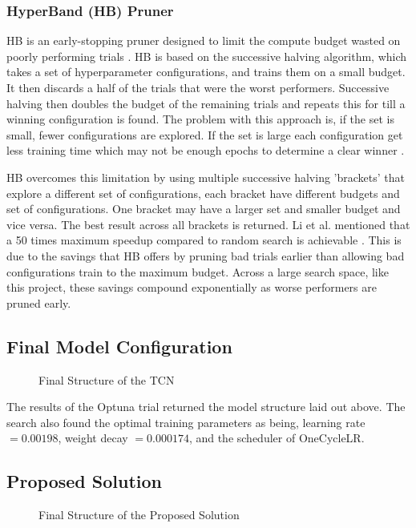 \subsubsection{HyperBand (HB) Pruner}
HB is an early-stopping pruner designed to limit the compute budget wasted on poorly performing trials \cite{li_2018_hyperband}. HB is based on 
the successive halving algorithm, which takes a set of hyperparameter configurations, and trains them on a small budget. It then discards 
a half of the trials that were the worst performers. Successive halving then doubles the budget of the remaining trials and repeats this for 
till a winning configuration is found. The problem with this approach is, if the set is small, fewer configurations are explored. If
the set is large each configuration get less training time which may not be enough epochs to determine a clear winner \cite{li_2018_hyperband}.

HB overcomes this limitation by using multiple successive halving 'brackets' that explore a different set of configurations, each bracket have 
different budgets and set of configurations. One bracket may have a larger set and smaller budget and vice versa. The best result across all
brackets is returned.  Li et al. mentioned that a 50 times maximum speedup compared to random search is achievable \cite{li_2018_hyperband}. This is
due to the savings that HB offers by pruning bad trials earlier than allowing bad configurations train to the maximum budget. Across a large search space, 
like this project, these savings compound exponentially as worse performers are pruned early. 


\subsection{Final Model Configuration}

\begin{figure}[H]
    \centering
    
    \caption{Final Structure of the TCN}
    \label{fig:structure}
\end{figure}

The results of the Optuna trial returned the model structure laid out above. The search also found the optimal
training parameters as being, learning rate $= 0.00198$, weight decay $= 0.000174$, and the scheduler of OneCycleLR. 


\subsection{Proposed Solution}

\begin{figure}[H]
    \centering
    
    \caption{Final Structure of the Proposed Solution}
    \label{fig:proposed}
\end{figure}





